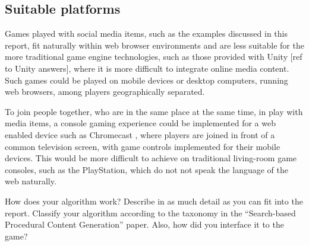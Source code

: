 \documentclass[]{article}
\begin{document}
\subsection{Suitable platforms}

Games played with social media items, such as the examples discussed in this report, fit naturally within web browser environments and are less suitable for the more traditional game engine technologies, such as those provided with Unity [ref to Unity answers], where it is more difficult to integrate online media content.  Such games could be played on mobile devices or desktop computers, running web browsers, among players geographically separated.  

To join people together, who are in the same place at the same time, in play with media items, a console gaming experience could be implemented for a web enabled device such as Chromecast \cite{ChromecastGames}, where players are joined in front of a common television screen, with game controls implemented for their mobile devices.  This would be more difficult to achieve on traditional living-room game consoles, such as the PlayStation, which do not not speak the language of the web naturally.



\begin{framed}
How does your algorithm work? Describe in as much detail as you can fit into the report. Classify your algorithm according to the taxonomy in the “Search-based Procedural Content Generation” paper. Also, how did you interface it to the game?
\end{framed}
\end{document}

